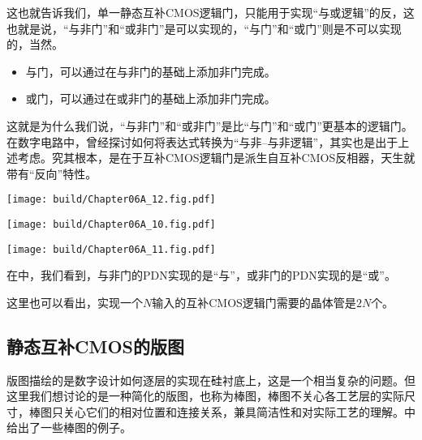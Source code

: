 这也就告诉我们，单一静态互补CMOS逻辑门，只能用于实现“与或逻辑”的反，这也就是说，“与非门”和“或非门”是可以实现的，“与门”和“或门”则是不可以实现的，当然。
\begin{itemize}
    \item 与门，可以通过在与非门的基础上添加非门完成。
    \item 或门，可以通过在或非门的基础上添加非门完成。
\end{itemize}
这就是为什么我们说，“与非门”和“或非门”是比“与门”和“或门”更基本的逻辑门。在数字电路中，曾经探讨如何将表达式转换为“与非--与非逻辑”，其实也是出于上述考虑。究其根本，是在于互补CMOS逻辑门是派生自互补CMOS反相器，天生就带有“反向”特性。

\begin{Figure}[互补CMOS逻辑门]
    \begin{FigureSub}[非门;互补CMOS逻辑门非门]
        \texttt{[image: build/Chapter06A\_12.fig.pdf]}
    \end{FigureSub}
    \hspace{0.25cm}
    \begin{FigureSub}
        \texttt{[image: build/Chapter06A\_10.fig.pdf]}
    \end{FigureSub}
    \hspace{0.25cm}
    \begin{FigureSub}
        \texttt{[image: build/Chapter06A\_11.fig.pdf]}
    \end{FigureSub}
\end{Figure}
在中，我们看到，与非门的PDN实现的是“与”，或非门的PDN实现的是“或”。

这里也可以看出，实现一个$N$输入的互补CMOS逻辑门需要的晶体管是$2N$个。

\subsection{静态互补CMOS的版图}
版图描绘的是数字设计如何逐层的实现在硅衬底上，这是一个相当复杂的问题。但这里我们想讨论的是一种简化的版图，也称为棒图，棒图不关心各工艺层的实际尺寸，棒图只关心它们的相对位置和连接关系，兼具简洁性和对实际工艺的理解。中给出了一些棒图的例子。

